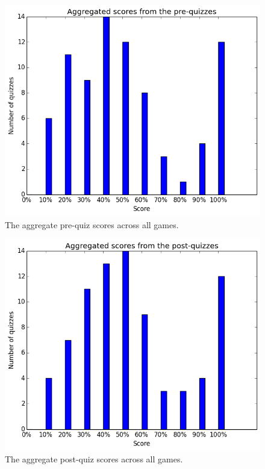 			\begin{figure}[h!] 
			\centering 
			\includegraphics[height=0.33\textheight]{general_pre.png} 
			\caption{The aggregate pre-quiz scores across all games.}
			\end{figure}

			\begin{figure}[h!] 
			\centering 
			\includegraphics[height=0.33\textheight]{general_post.png} 
			\caption{The aggregate post-quiz scores across all games.}
			\end{figure}

